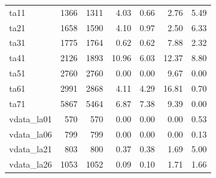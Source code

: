 \begin{table}[pos=htbp]
{\begin{tabular}{lrrrrrr}
ta11 & 1366 & 1311 & 4.03 & 0.66 & 2.76 & 5.49 \\
ta21 & 1658 & 1590 & 4.10 & 0.97 & 2.50 & 6.33 \\
ta31 & 1775 & 1764 & 0.62 & 0.62 & 7.88 & 2.32 \\
ta41 & 2126 & 1893 & 10.96 & 6.03 & 12.37 & 8.80 \\
ta51 & 2760 & 2760 & 0.00 & 0.00 & 9.67 & 0.00 \\
ta61 & 2991 & 2868 & 4.11 & 4.29 & 16.81 & 0.70 \\
ta71 & 5867 & 5464 & 6.87 & 7.38 & 9.39 & 0.00 \\
vdata\_la01 & 570 & 570 & 0.00 & 0.00 & 0.00 & 0.53 \\
vdata\_la06 & 799 & 799 & 0.00 & 0.00 & 0.00 & 0.13 \\
vdata\_la21 & 803 & 800 & 0.37 & 0.38 & 1.69 & 5.00 \\
vdata\_la26 & 1053 & 1052 & 0.09 & 0.10 & 1.71 & 1.66 \\
\bottomrule
\end{tabular}}
\end{table}
